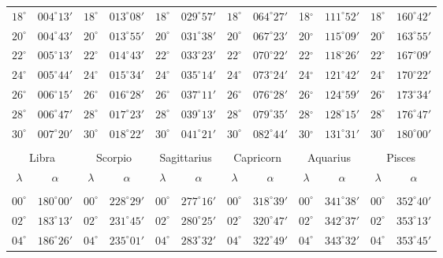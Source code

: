 \begin{table}[!h]
{\begin{tabular}{cc|cc|cc|cc|cc|cc}
$18^\circ$ & $004^\circ13'$ & $18^\circ$ & $013^\circ08'$ & $18^\circ$ & $029^\circ57'$ & $18^\circ$ & $064^\circ27'$ & 18$^\circ$ & $111^\circ52'$ & $18^\circ$ & $160^\circ42'$\\
$20^\circ$ & $004^\circ43'$ & $20^\circ$ & $013^\circ55'$ & $20^\circ$ & $031^\circ38'$ & $20^\circ$ & $067^\circ23'$ & 20$^\circ$ & $115^\circ09'$ & $20^\circ$ & $163^\circ55'$\\
$22^\circ$ & $005^\circ13'$ & $22^\circ$ & $014^\circ43'$ & $22^\circ$ & $033^\circ23'$ & $22^\circ$ & $070^\circ22'$ & 22$^\circ$ & $118^\circ26'$ & $22^\circ$ & $167^\circ09'$\\
$24^\circ$ & $005^\circ44'$ & $24^\circ$ & $015^\circ34'$ & $24^\circ$ & $035^\circ14'$ & $24^\circ$ & $073^\circ24'$ & 24$^\circ$ & $121^\circ42'$ & $24^\circ$ & $170^\circ22'$\\
$26^\circ$ & $006^\circ15'$ & $26^\circ$ & $016^\circ28'$ & $26^\circ$ & $037^\circ11'$ & $26^\circ$ & $076^\circ28'$ & 26$^\circ$ & $124^\circ59'$ & $26^\circ$ & $173^\circ34'$\\
$28^\circ$ & $006^\circ47'$ & $28^\circ$ & $017^\circ23'$ & $28^\circ$ & $039^\circ13'$ & $28^\circ$ & $079^\circ35'$ & 28$^\circ$ & $128^\circ15'$ & $28^\circ$ & $176^\circ47'$\\
$30^\circ$ & $007^\circ20'$ & $30^\circ$ & $018^\circ22'$ & $30^\circ$ & $041^\circ21'$ & $30^\circ$ & $082^\circ44'$ & 30$^\circ$ & $131^\circ31'$ & $30^\circ$ & $180^\circ00'$\\
\multicolumn{12}{c}{}\\
\multicolumn{2}{c}{Libra}\vline & \multicolumn{2}{c}{Scorpio} \vline& \multicolumn{2}{c}{Sagittarius} \vline& \multicolumn{2}{c}{Capricorn}\vline &
\multicolumn{2}{c}{Aquarius}\vline & \multicolumn{2}{c}{Pisces}\\\hline
$\lambda$& $\alpha$& $\lambda$& $\alpha$& $\lambda$& $\alpha$& $\lambda$& $\alpha$& $\lambda$& $\alpha$& $\lambda$& $\alpha$\\\hline
&&&&&&&&&&&\\[-2ex]
$00^\circ$ & $180^\circ00'$ & $00^\circ$ & $228^\circ29'$ & $00^\circ$ & $277^\circ16'$ & $00^\circ$ & $318^\circ39'$ &  $00^\circ$ & $341^\circ38'$ & $00^\circ$ & $352^\circ40'$\\
$02^\circ$ & $183^\circ13'$ & $02^\circ$ & $231^\circ45'$ & $02^\circ$ & $280^\circ25'$ & $02^\circ$ & $320^\circ47'$ &  $02^\circ$ & $342^\circ37'$ & $02^\circ$ & $353^\circ13'$\\
$04^\circ$ & $186^\circ26'$ & $04^\circ$ & $235^\circ01'$ & $04^\circ$ & $283^\circ32'$ & $04^\circ$ & $322^\circ49'$ &  $04^\circ$ & $343^\circ32'$ & $04^\circ$ & $353^\circ45'$\\

\end{tabular}}
\end{table}
